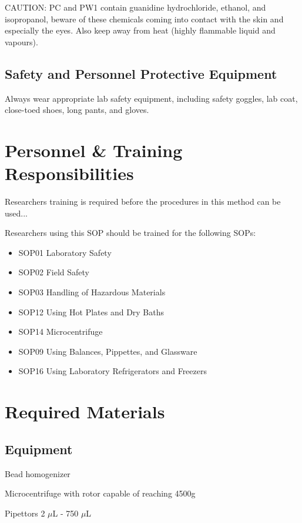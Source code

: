 \documentclass[12pt]{../SOP3_alpha}\usepackage[]{graphicx}\usepackage[]{color}
\begin{document}
\NP CAUTION: PC and PW1 contain guanidine hydrochloride, ethanol, and isopropanol, beware of these chemicals coming into contact with the skin and especially the eyes. Also keep away from heat (highly flammable liquid and vapours).

\subsection{Safety and Personnel Protective Equipment}

\NP Always wear appropriate lab safety equipment, including safety goggles, lab coat, close-toed shoes, long pants, and gloves. 

\section{Personnel \& Training Responsibilities}

\NP Researchers training is required before the procedures in this method can be used... 

\NP Researchers using this SOP should be trained for the following SOPs:

\begin{itemize}
  \item SOP01 Laboratory Safety
  \item SOP02 Field Safety
  \item SOP03 Handling of Hazardous Materials
  \item SOP12 Using Hot Plates and Dry Baths
  \item SOP14 Microcentrifuge
  \item SOP09 Using Balances, Pippettes, and Glassware
  \item SOP16 Using Laboratory Refrigerators and Freezers
\end{itemize}


\section{Required Materials}

\subsection{Equipment}

\NP Bead homogenizer

\NP Microcentrifuge with rotor capable of reaching 4500g

\NP Pipettors 2 $\mu$L - 750 $\mu$L
\end{document}

